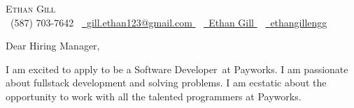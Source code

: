 
\newcommand{\userName}{Ethan Gill}
\newcommand{\userFullName}{Ethan Gill}
\newcommand{\userPhone}{(587) 703-7642}
\newcommand{\userEmail}{gill.ethan123@gmail.com}
\newcommand{\userGithub}{ethangillengg}
\newcommand{\userLinkedIn}{https://www.linkedin.com/in/ethan-gill-008a00258/}
\newcommand{\currentUniversity}{the University of Calgary's Schulich School of Engineering}
\newcommand{\companyName}{Payworks}
\newcommand{\jobTitle}{Software Developer}
\newcommand{\introTopics}{fullstack development and solving problems}
\newcommand{\whyMePersonalized}{Since my graduation, I have been able to utilize all of the concepts I learned through my education while also expanding my knowledge base and gaining experience with the various frameworks in the .NET ecosystem.

	\par
	Currently I am working at a consulting company, Sunwapta Solutions, where I meet directly with clients to gather business requirements, as well as leading my team on best practices and process. As an added bonus, all of my experience at Sunwapta, I have been working with Vue.js, .NET Core, and Microsoft SQL Server, which will allow me to transition into the role at \companyName\ easily.
}



\begin{center}
	{\Huge \scshape \userFullName} \\ \vspace{4pt}
	\small \raisebox{-0.1\height}\faPhone\ \userPhone ~
	\href{mailto:\userEmail}{
		\raisebox{-0.2\height}\faEnvelope\  \underline{\userEmail}
	} ~
	\href{\userLinkedIn}{
		\raisebox{-0.2\height}\faLinkedin\ \underline{\userName}
	} ~
	\href{https://github.com/\userGithub}{
		\raisebox{-0.2\height}\faGithub\ \underline{\userGithub}
	} 
\end{center}

\vspace{8pt}

\noindent{}\large{Dear Hiring Manager,}

\par{}

I am excited to apply to be a \jobTitle~at \companyName. I am passionate about \introTopics. I am ecstatic about the opportunity to work with all the talented programmers at \companyName.


